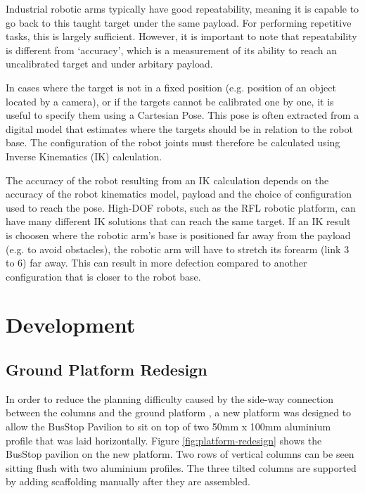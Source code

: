 Industrial robotic arms typically have good repeatability, meaning it is capable to go back to this taught target under the same payload. For performing repetitive tasks, this is largely sufficient. However, it is important to note that repeatability is different from ‘accuracy’, which is a measurement of its ability to reach an uncalibrated target and under arbitary payload.

In cases where the target is not in a fixed position (e.g. position of an object located by a camera), or if the targets cannot be calibrated one by one, it is useful to specify them using a Cartesian Pose. This pose is often extracted from a digital model that estimates where the targets should be in relation to the robot base. The configuration of the robot joints must therefore be calculated using Inverse Kinematics (IK) calculation.

The accuracy of the robot resulting from an IK calculation depends on the accuracy of the robot kinematics model, payload and the choice of configuration used to reach the pose. High-DOF robots, such as the RFL robotic platform, can have many different IK solutions that can reach the same target. If an IK result is choosen where the robotic arm's base is positioned far away from the payload (e.g. to avoid obstacles), the robotic arm will have to stretch its forearm (link 3 to 6) far away. This can result in more defection compared to another configuration that is closer to the robot base.

\FloatBarrier

\section{Development}
\label{section:exploration-3-development}

\subsection{Ground Platform Redesign}
\label{subsection:exploration-3-ground-platform-redesign}

In order to reduce the planning difficulty caused by the side-way connection between the columns and the ground platform , a new platform was designed to allow the BusStop Pavilion to sit on top of two 50mm x 100mm aluminium profile that was laid horizontally. Figure \ref{fig:platform-redesign} shows the BusStop pavilion on the new platform. Two rows of vertical columns can be seen sitting flush with two aluminium profiles. The three tilted columns are supported by adding scaffolding manually after they are assembled.

